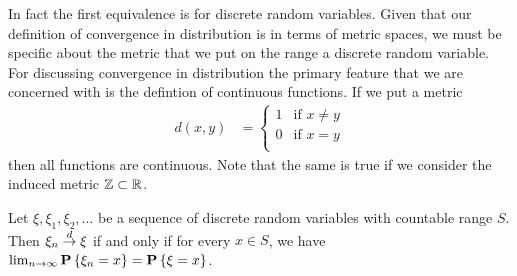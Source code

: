 In fact the first equivalence is for discrete random variables.  Given
that our definition of convergence in distribution is in terms of
metric spaces, we must be specific about the metric that we put on the
range a discrete random variable.  For discussing convergence in
distribution the primary feature that we are concerned with is the
defintion of continuous functions.  If we put a metric 
\begin{align*}
d(x,y) &= \begin{cases}
1 & \text{if $x \neq y$} \\
0 & \text{if $x = y$} \\
\end{cases}
\end{align*}
then all functions are continuous.  Note that the same is true if we
consider the induced metric $\mathbb{Z} \subset \mathbb{R}$.
\begin{lem}\label{ConvergenceInDistributionAsConvergenceOfDistributionFunctionsDiscreteCase}
Let $\xi, \xi_1, \xi_2, \dots$ be a sequence of discrete random
variables with countable range $S$.  Then $\xi_n \overset{d}\to \xi$ if and
only if for every $x \in S$, we have $\lim_{n \to \infty}
\textbf{P}\left \{\xi_n = x \right \} = \textbf{P}\left \{\xi = x \right \}$.
\end{lem}
